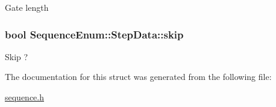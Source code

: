 Gate length \hypertarget{structSequenceEnum_1_1StepData_ac3146c1d3252ee1326959fa3b8191490}{
\subsubsection[{skip}]{\setlength{\rightskip}{0pt plus 5cm}bool Sequence\-Enum\-::\-Step\-Data\-::skip}}\label{structSequenceEnum_1_1StepData_ac3146c1d3252ee1326959fa3b8191490}
Skip ? 

The documentation for this struct was generated from the following file\-:\begin{DoxyCompactItemize}
\item 
\hyperlink{sequence_8h}{sequence.\-h}\end{DoxyCompactItemize}
